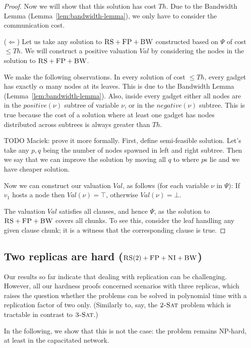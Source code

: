 \documentclass[9pt,twocolumn]{scrartcl}
\newcommand{\variab}{\nu}
\newcommand{\clauses}{\alpha}
\newcommand{\CC}{\textsc{NI}}
\newcommand{\FP}{\textsc{FP}}
\newcommand{\RS}{\textsc{RS}}
\newcommand{\BW}{\textsc{BW}}
\newcommand{\TSAT}{\textsc{3-Sat}}
\newcommand{\ZSAT}{\textsc{2-Sat}}
\newcommand{\Formula}{\ensuremath{\Psi}}
\newcommand{\Thr}{\ensuremath{Th}}
\newcommand{\positive}{\ensuremath{positive}}
\newcommand{\negative}{\ensuremath{negative}}
\newcommand{\Val}{\ensuremath{Val}}
\begin{document}
\begin{appendix}
\begin{proof}
Now we will show that this solution has cost $\Thr$.
Due to the Bandwidth Lemma (Lemma~\ref{lem:bandwidth-lemma}),
we only have to consider the communication cost.

($\Leftarrow$) Let us take any solution to $\RS+\FP+\BW$ constructed based on $\Formula$ of cost $\leq \Thr$.
We will construct a positive valuation $\Val$ by considering the nodes in
the solution to $\RS+\FP+\BW$.

We make the following observations. In every solution of cost
$\leq \Thr$, every gadget has exactly $\clauses$ many nodes
at its leaves. This is due to the Bandwidth Lemma (Lemma~\ref{lem:bandwidth-lemma}).
Also, inside
every gadget either all nodes are in the $\positive(\variab)$ subtree
of variable $\variab$, or in the $\negative(\variab)$ subtree. This is true
because the cost of a solution where at least one gadget has nodes
distributed across subtrees is
always greater than $\Thr$.

TODO Maciek: prove it more formally. First, define semi-feasible solution. Let's take any $p,q$ being the number of nodes
spawned in left and right subtree. Then we say that we can improve the
solution by moving all $q$ to where $p$s lie and we have cheaper solution.

Now we can construct our valuation $\Val$, as follows
(for each variable $\variab$ in $\Formula$):
If $v_1$ hosts a node then $\Val(\variab) = \top$,
otherwise $\Val(\variab) = \bot$.

The valuation $\Val$ satisfies all clauses, and hence $\Formula$,
as the solution to $\RS+\FP+\BW$ covers all chunks. To see this,
consider the leaf handling any given clause chunk;
it is a witness that the corresponding clause is true.
\end{proof}

\subsection{Two replicas are hard ($\RS(2)+\FP+\CC+\BW$)}\label{ssec:two}

Our results so far indicate that dealing with replication can be challenging.
However, all our hardness proofs concerned scenarios with three replicas,
which raises the question whether the problems can be solved in polynomial time
with a replication factor of two only. (Similarly to, say, the $\ZSAT$ problem
which is tractable in contrast to $\TSAT$.)

In the following, we show that this is not the case: the problem remains
NP-hard, at least in the capacitated network.


\end{appendix}
\end{document}
